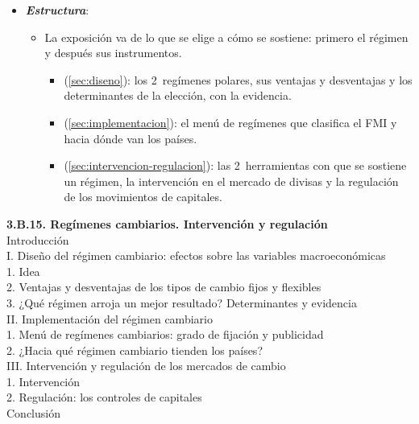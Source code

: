 \documentclass[11pt]{article}
\begin{document}
\begin{itemize}
\item \textbf{\emph{Estructura}}:
  \begin{itemize}
  \item La exposición va de lo que se elige a cómo se sostiene: primero el régimen y después sus instrumentos.
    \begin{itemize}
    \item {} (\ref{sec:diseno}): los 2~regímenes polares, sus ventajas y desventajas y los determinantes de la elección, con la evidencia.
    \item {} (\ref{sec:implementacion}): el menú de regímenes que clasifica el FMI y hacia dónde van los países.
    \item {} (\ref{sec:intervencion-regulacion}): las 2~herramientas con que se sostiene un régimen, la intervención en el mercado de divisas y la regulación de los movimientos de capitales.
    \end{itemize}
  \end{itemize}
\end{itemize}

\begin{esquema}[unbreakable]
\textbf{3.B.15. Regímenes cambiarios. Intervención y regulación}\\[2pt]
Introducción\\
I. Diseño del régimen cambiario: efectos sobre las variables macroeconómicas\\
\hspace*{1.5em}1. Idea\\
\hspace*{1.5em}2. Ventajas y desventajas de los tipos de cambio fijos y flexibles\\
\hspace*{1.5em}3. ¿Qué régimen arroja un mejor resultado? Determinantes y evidencia\\
II. Implementación del régimen cambiario\\
\hspace*{1.5em}1. Menú de regímenes cambiarios: grado de fijación y publicidad\\
\hspace*{1.5em}2. ¿Hacia qué régimen cambiario tienden los países?\\
III. Intervención y regulación de los mercados de cambio\\
\hspace*{1.5em}1. Intervención\\
\hspace*{1.5em}2. Regulación: los controles de capitales\\
Conclusión
\end{esquema}
\end{document}
